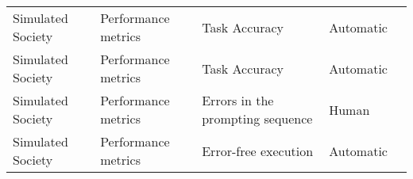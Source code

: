 \begin{small}
\begin{center}
\begin{longtable}{@{}p{}p{}p{}p{}p{}@{}}
Simulated Society        & Performance metrics                 & Task Accuracy                                                                                                                                                                                               & Automatic & \cite{Zhang2023ExploringCM}                                                                                                                                                                                                                                                                                                                                                                               \\
Simulated Society        & Performance metrics                 & Task Accuracy                                                                                                                                                                                               & Automatic & \cite{lan2024depressiondiagnosisdialoguesimulation}                                                                                                                                                                                                                                                                                                                                                                                          \\
Simulated Society        & Performance metrics                 & Errors in the prompting sequence                                                                                                                                                                            & Human     & \cite{10.1145/3570945.3607303}                                                                                                                                                                                                                                                                                                                                                                              \\
Simulated Society        & Performance metrics                 & Error-free execution                                                                                                                                                                                        & Automatic & \cite{wang2024megaagentpracticalframeworkautonomous}                                                                                                                                                                                                                                                                                                                                                                                              \\

\end{longtable}
\end{center}
\end{small}
